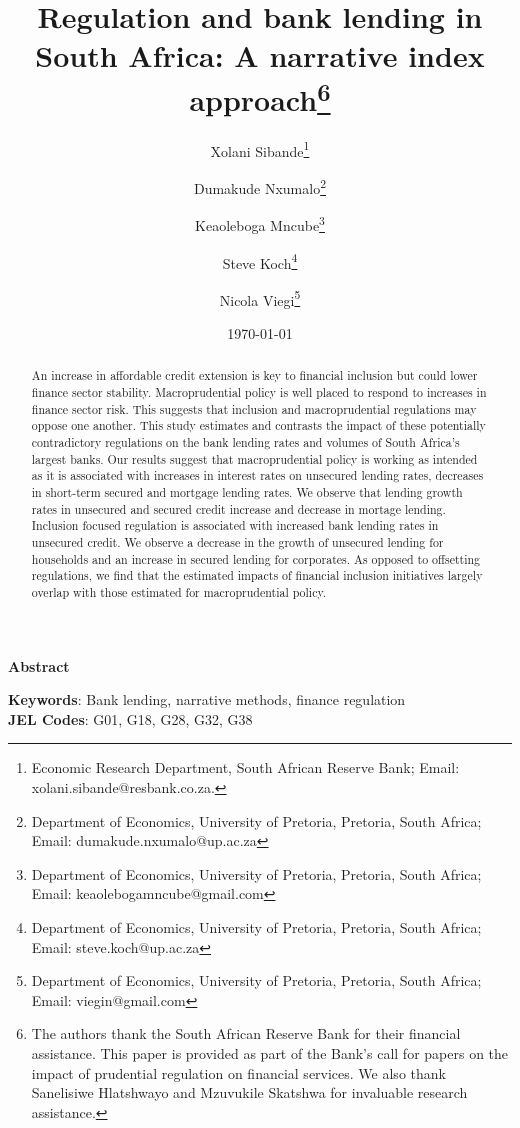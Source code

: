 \title{Regulation and bank lending in South Africa: A narrative index approach\thanks{The authors thank the South African Reserve Bank for their financial assistance. This paper is provided as part of the Bank's call for papers on the impact of prudential regulation on financial services. We also thank Sanelisiwe Hlatshwayo and Mzuvukile Skatshwa for invaluable research assistance.}}

\author {Xolani Sibande\footnote{Economic Research Department, South African Reserve Bank; Email: xolani.sibande@resbank.co.za.} \and
Dumakude Nxumalo\footnote{Department of Economics, University of Pretoria, Pretoria, South Africa; Email: dumakude.nxumalo@up.ac.za} \and
Keaoleboga Mncube\footnote{Department of Economics, University of Pretoria, Pretoria, South Africa; Email: keaolebogamncube@gmail.com} \and
Steve Koch\footnote{Department of Economics, University of Pretoria, Pretoria, South Africa; Email: steve.koch@up.ac.za} \and
Nicola Viegi\footnote{Department of Economics, University of Pretoria, Pretoria, South Africa; Email: viegin@gmail.com}}

\date{\today}
\maketitle

\begin{center}
\textbf{Abstract}
\end{center}

\begin{abstract}
An increase in affordable credit extension is key to financial inclusion but could lower finance sector stability. Macroprudential policy is well placed to respond to increases in finance sector risk. This suggests that inclusion and macroprudential regulations may oppose one another. This study estimates and contrasts the impact of these potentially contradictory regulations on the bank lending rates and volumes of South Africa's largest banks. Our results suggest that macroprudential policy is working as intended as it is associated with increases in interest rates on unsecured lending rates, decreases in short-term secured and mortgage lending rates. We observe that lending growth rates in unsecured and secured credit increase and decrease in mortage lending. Inclusion focused regulation is associated with increased bank lending rates in unsecured credit. We observe a decrease in the growth of unsecured lending for households and an increase in secured lending for corporates. As opposed to offsetting regulations, we find that the estimated impacts of financial inclusion initiatives largely overlap with those estimated for macroprudential policy.
\end{abstract}


\noindent\textbf{Keywords}: Bank lending, narrative methods, finance regulation\\
\textbf{JEL Codes}: G01, G18, G28, G32, G38
\newpage